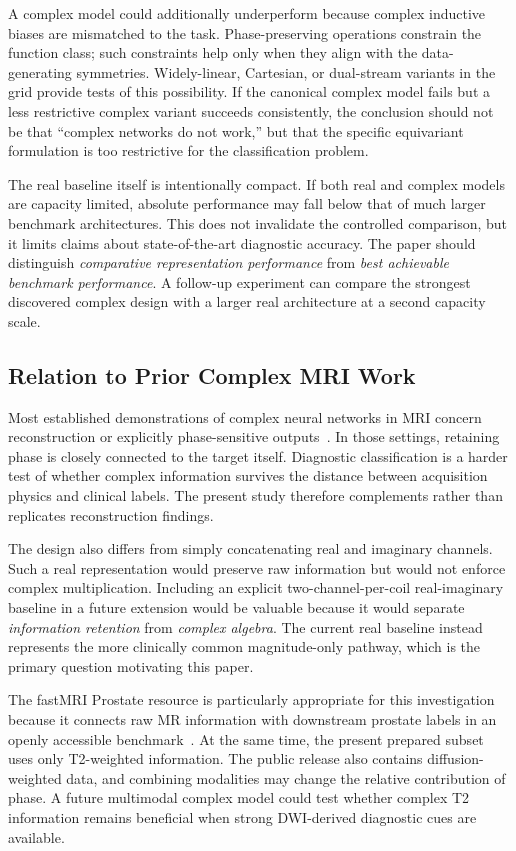 \documentclass[journal]{IEEEtran}
\begin{document}
A complex model could additionally underperform because complex inductive biases are mismatched to the task. Phase-preserving operations constrain the function class; such constraints help only when they align with the data-generating symmetries. Widely-linear, Cartesian, or dual-stream variants in the grid provide tests of this possibility. If the canonical complex model fails but a less restrictive complex variant succeeds consistently, the conclusion should not be that ``complex networks do not work,'' but that the specific equivariant formulation is too restrictive for the classification problem.

The real baseline itself is intentionally compact. If both real and complex models are capacity limited, absolute performance may fall below that of much larger benchmark architectures. This does not invalidate the controlled comparison, but it limits claims about state-of-the-art diagnostic accuracy. The paper should distinguish \emph{comparative representation performance} from \emph{best achievable benchmark performance}. A follow-up experiment can compare the strongest discovered complex design with a larger real architecture at a second capacity scale.

\subsection{Relation to Prior Complex MRI Work}
Most established demonstrations of complex neural networks in MRI concern reconstruction or explicitly phase-sensitive outputs~\cite{Cole2021ComplexMRI,Xiao2022ComplexPartialFourier}. In those settings, retaining phase is closely connected to the target itself. Diagnostic classification is a harder test of whether complex information survives the distance between acquisition physics and clinical labels. The present study therefore complements rather than replicates reconstruction findings.

The design also differs from simply concatenating real and imaginary channels. Such a real representation would preserve raw information but would not enforce complex multiplication. Including an explicit two-channel-per-coil real-imaginary baseline in a future extension would be valuable because it would separate \emph{information retention} from \emph{complex algebra}. The current real baseline instead represents the more clinically common magnitude-only pathway, which is the primary question motivating this paper.

The fastMRI Prostate resource is particularly appropriate for this investigation because it connects raw MR information with downstream prostate labels in an openly accessible benchmark~\cite{Tibrewala2024FastMRIProstate}. At the same time, the present prepared subset uses only T2-weighted information. The public release also contains diffusion-weighted data, and combining modalities may change the relative contribution of phase. A future multimodal complex model could test whether complex T2 information remains beneficial when strong DWI-derived diagnostic cues are available.
\end{document}
